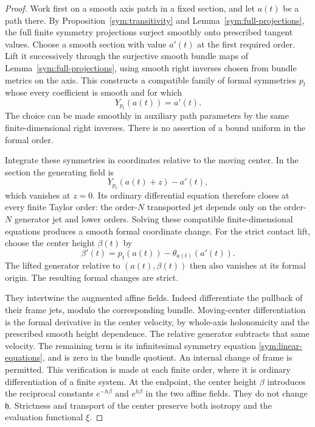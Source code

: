 \begin{proof}
Work first on a smooth axis patch in a fixed section, and let $a(t)$
be a path there.  By Proposition~\ref{sym:transitivity} and
Lemma~\ref{sym:full-projections}, the full finite symmetry projections
surject smoothly onto prescribed tangent values.  Choose a smooth
section with value $a'(t)$ at the first required order.  Lift it
successively through the surjective smooth bundle maps of
Lemma~\ref{sym:full-projections}, using smooth right inverses
chosen from bundle metrics on the axis.
This constructs a compatible family of formal symmetries $p_t$
whose every coefficient is smooth and for which
\[
 Y_{p_t}(a(t))=a'(t).
\]
The choice can be made smoothly in auxiliary path parameters by the
same finite-dimensional right inverses.  There is no assertion of
a bound uniform in the formal order.

Integrate these symmetries in coordinates relative to the moving
center.  In the section the generating field is
\[
 Y_{p_t}(a(t)+z)-a'(t),
\]
which vanishes at $z=0$.  Its ordinary differential equation therefore
closes at every finite Taylor order: the order-$N$ transported jet
depends only on the order-$N$ generator jet and lower orders.
Solving these compatible finite-dimensional equations produces a
smooth formal coordinate change.  For the strict contact lift,
choose the center height $\beta(t)$ by
\[
 \beta'(t)=p_t(a(t))-\theta_{a(t)}(a'(t)).
\]
The lifted generator relative to $(a(t),\beta(t))$ then also vanishes
at its formal origin.  The resulting formal changes are strict.

They intertwine the augmented affine fields.  Indeed differentiate
the pullback of their frame jets, modulo the corresponding bundle.
Moving-center differentiation is
the formal derivative in the center velocity, by whole-axis
holonomicity and the prescribed smooth height dependence.  The
relative generator subtracts that same velocity.  The remaining
term is its infinitesimal symmetry equation
\eqref{sym:linear-equations}, and is zero in the bundle quotient.
An internal change of frame is permitted.  This verification is made
at each finite order, where it is ordinary differentiation of a
finite system.  At the endpoint, the center height $\beta$ introduces
the reciprocal constants $e^{-h\beta}$ and $e^{h\beta}$ in the two
affine fields.  They do not change $\mathfrak h$.  Strictness and
transport of the center preserve both isotropy and the evaluation
functional $\xi$.


\end{proof}
